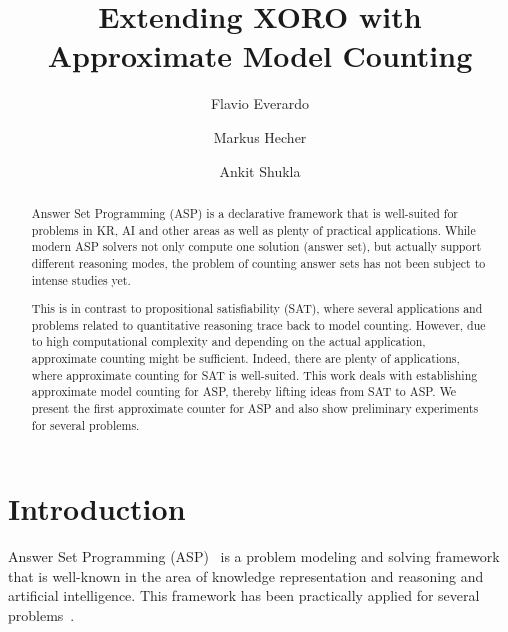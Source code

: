 \documentclass{svproc}
\begin{document}
\mainmatter              %
%
\title{Extending XORO with Approximate Model Counting}
%
%
%
\author{
	Flavio Everardo\and
	Markus Hecher\and
	Ankit Shukla
}
%
%
%

\maketitle              %

\begin{abstract}
Answer Set Programming (ASP) is a declarative framework that is well-suited for problems in KR, AI and other areas as well as plenty of practical applications.
While modern ASP solvers not only compute one solution (answer set), but actually support different reasoning modes, the problem of counting answer sets has not been subject to intense studies yet.

This is in contrast to propositional satisfiability (SAT), where several applications and problems related to quantitative reasoning trace back to model counting. However, due to high computational complexity and depending on the actual application, approximate counting might be sufficient. Indeed, there are plenty of applications, where approximate counting for SAT is well-suited. This work deals with establishing approximate model counting for ASP, thereby lifting ideas from SAT to ASP. We present the first approximate counter for ASP and also show preliminary experiments for several problems.
\end{abstract}
%

\section{Introduction} \label{sec:introduction}
%
Answer Set Programming (ASP)~\cite{Lifschitz99,BrewkaEiterTruszczynski11,GebserKaminskiKaufmannSchaub12} is a
problem modeling and solving framework that is well-known in the area
of knowledge representation and reasoning and artificial intelligence.
%
This framework has been practically applied for several
problems~\cite{BalducciniGelfondNogueira06a,NiemelaSimonsSoininen99,NogueiraBalducciniGelfond01a,GuziolowskiEtAl13a,SchaubWoltran18}.
%
\end{document}
